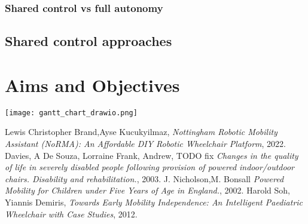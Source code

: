 \documentclass{article}
\begin{document}
\subsubsection{Shared control vs full autonomy}
\subsection{Shared control approaches}


\section{Aims and Objectives}


\texttt{[image: gantt\_chart\_drawio.png]}

\begin{thebibliography}{9}

  Lewis Christopher Brand,Ayse Kucukyilmaz,
  \textit{Nottingham Robotic Mobility Assistant (NoRMA): An Affordable DIY Robotic Wheelchair Platform},
  2022.
  Davies, A De Souza, Lorraine Frank, Andrew, TODO fix
  \textit{Changes in the quality of life in severely disabled people following provision of powered indoor/outdoor chairs. Disability and rehabilitation.},
  2003.
  J. Nicholson,M. Bonsall
  \textit{Powered Mobility for Children under Five Years of Age in England.},
  2002.
  Harold Soh, Yiannis Demiris,
  \textit{Towards Early Mobility Independence: An Intelligent Paediatric Wheelchair with Case Studies},
  2012.

\end{thebibliography}
\end{document}
